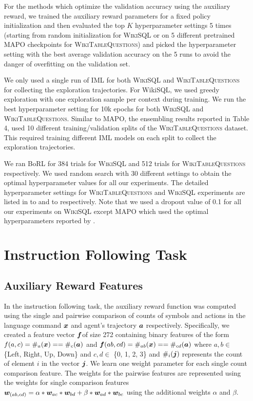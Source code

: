 For the methods which optimize the validation accuracy using the
auxiliary reward, we trained the auxiliary reward parameters for a
fixed policy initialization and then evaluated the top $K$ hyperparameter settings 5
times (starting from random initialization for \textsc{WikiSQL} or on 5 different pretrained MAPO
checkpoints for \textsc{WikiTableQuestions}) and picked the hyperparameter setting with the best
average validation accuracy on the 5 runs to avoid the danger of
overfitting on the validation set.

We only used a single run of IML for both \textsc{WikiSQL}
and \textsc{WikiTableQuestions} for collecting the exploration
trajectories. For WikiSQL, we used greedy exploration with one
exploration sample per context during training. We run the best
hyperparameter setting for 10k epochs for both \textsc{WikiSQL}
and \textsc{WikiTableQuestions}. Similar to MAPO, the ensembling results reported in Table 4,
used 10 different training/validation splits of the \textsc{WikiTableQuestions} dataset.
This required training  different IML models on each split to collect the exploration
trajectories.

We ran BoRL for 384 trials for \textsc{WikiSQL} and 512 trials for \textsc{WikiTableQuestions} respectively.
We used random search with 30 different settings to obtain the optimal hyperparameter values
for all our experiments. The detailed hyperparameter settings for \textsc{WikiTableQuestions}
and \textsc{WikiSQL} experiments are listed in  to  and  to  respectively.
Note that we used a dropout value of 0.1 for all our experiments on \textsc{WikiSQL} except
MAPO which used the optimal hyperparameters reported by \citet{NIPS2018_8204}.

\section{Instruction Following Task}
\label{sup:ift}

\subsection{Auxiliary Reward Features}
In the instruction following task, the auxiliary reward function was computed using the single and pairwise comparison of
counts of symbols and actions in the language command $\displaystyle {\bm{x}}$ and agent's trajectory $\displaystyle {\bm{a}}$ respectively. Specifically, we created a
feature vector $\displaystyle {\bm{f}}$of size 272 containing binary features of the form $\displaystyle f(a, c) = \#_{a}({\bm{x}}) == \#_{c}({\bm{a}})$
and $\displaystyle {\bm{f}}(ab, cd) = \#_{ab}({\bm{x}}) == \#_{cd}({\bm{a}})$ where $ a, b \in$  \{Left, Right, Up, Down\} and $c, d \in$ \{0, 1, 2, 3\} and $\displaystyle \#_i({\bm{j}})$ represents
the count of element $i$ in the vector $\displaystyle {\bm{j}}$. We learn one weight parameter for each single count comparison feature. The weights for the pairwise features are
represented using the weights for single comparison features ${\bm{w}}_{(ab,cd)} = \alpha * {\bm{w}}_{ac} * {\bm{w}}_{bd} +  \beta * {\bm{w}}_{ad} * {\bm{w}}_{bc}$ using the additional weights $\alpha$
and $\beta$.

